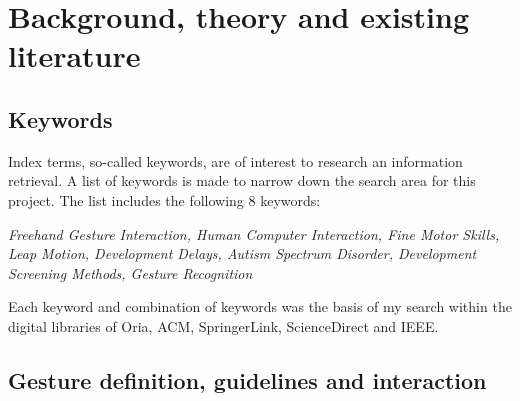 \chapter{Background, theory and existing literature}
\label{chap:background}


\section{Keywords}
\label{sec:keywords}
Index terms, so-called keywords, are of interest to research an information retrieval. A list of keywords is made to narrow down the search area for this project. The list includes the following 8 keywords: 
\newline

\textit{Freehand Gesture Interaction, Human Computer Interaction, Fine Motor Skills, Leap Motion, Development Delays, Autism Spectrum Disorder, Development Screening Methods,  Gesture Recognition}
\newline

Each keyword and combination of keywords was the basis of my search within the digital libraries of Oria, ACM, SpringerLink, ScienceDirect and IEEE.

  

\section{Gesture definition, guidelines and interaction}
\label{sec:gesture}

